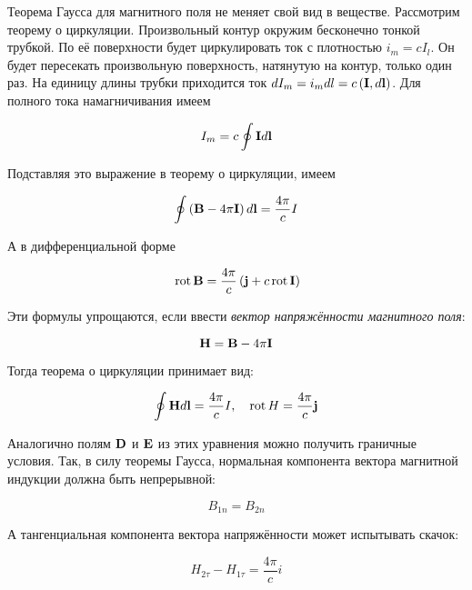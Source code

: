 Теорема Гаусса для магнитного поля не меняет свой вид в веществе. Рассмотрим теорему о циркуляции. Произвольный контур окружим бесконечно тонкой трубкой. По её поверхности будет циркулировать ток с плотностью $i_m = c I_l$. Он будет пересекать произвольную поверхность, натянутую на контур, только один раз. На единицу длины трубки приходится ток $dI_m = i_m dl = c \left( \mathbf I, d \mathbf l \right)$. Для полного тока намагничивания имеем

\begin{equation}
    I_m = c \oint \mathbf I d \mathbf l
\end{equation}

\noindent
Подставляя это выражение в теорему о циркуляции, имеем

\begin{equation}
    \oint \left( \mathbf B - 4 \pi \mathbf I \right) d \mathbf l = \frac{4 \pi}{c} I
\end{equation}

\noindent
А в дифференциальной форме

\begin{equation}
    \, \text{rot} \, \mathbf B = \frac{4 \pi}{c} \left( \mathbf j + c \, \text{rot} \, \mathbf I \right)
\end{equation}

Эти формулы упрощаются, если ввести \textit{вектор напряжённости магнитного поля}:

\begin{equation}
    \mathbf H = \mathbf B - 4 \pi \mathbf I
\end{equation}

\noindent
Тогда теорема о циркуляции принимает вид:

\begin{align}
    \oint \mathbf H d \mathbf l &= \frac{4 \pi}{c} I, & \, \text{rot} \, H = \frac{4 \pi}{c} \mathbf j
\end{align}

Аналогично полям $\mathbf D$ и $\mathbf E$ из этих уравнения можно получить граничные условия. Так, в силу теоремы Гаусса, нормальная компонента вектора магнитной индукции должна быть непрерывной:

\begin{equation}
    B_{1n} = B_{2n}
\end{equation}

А тангенциальная компонента вектора напряжённости может испытывать скачок:

\begin{equation}
    H_{2 \tau} - H_{1 \tau} = \frac{4 \pi}{c} i
\end{equation}